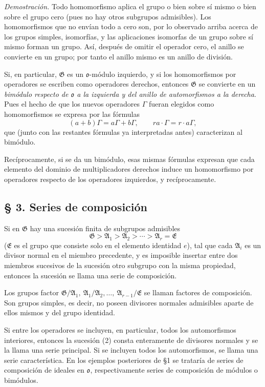 \documentclass[11pt]{article}
\providecommand{\mG}{\mathfrak{G}}
\providecommand{\mA}{\mathfrak{A}}
\providecommand{\mE}{\mathfrak{E}}
\providecommand{\mo}{\mathfrak{o}}
\begin{document}
\emph{Demostración.} Todo homomorfismo aplica el grupo o bien sobre sí mismo o bien sobre el grupo cero (pues no hay otros subgrupos admisibles). Los homomorfismos que no envían todo a cero son, por lo observado arriba acerca de los grupos simples, isomorfías, y las aplicaciones isomorfas de un grupo sobre sí mismo forman un grupo. Así, después de omitir el operador cero, el anillo se convierte en un grupo; por tanto el anillo mismo es un anillo de división.

Si, en particular, $\mG$ es un $\mo$-módulo izquierdo, y si los homomorfismos por operadores se escriben como operadores derechos, entonces $\mG$ se convierte en un \emph{bimódulo respecto de $\mo$ a la izquierda y del anillo de automorfismos a la derecha}. Pues el hecho de que los nuevos operadores $\Gamma$ fueran elegidos como homomorfismos se expresa por las fórmulas
\[
        (a+b)\Gamma=a\Gamma+b\Gamma,
        \qquad ra\cdot\Gamma=r\cdot a\Gamma,
\]
que (junto con las restantes fórmulas ya interpretadas antes) caracterizan al bimódulo.

Recíprocamente, si se da un bimódulo, esas mismas fórmulas expresan que cada elemento del dominio de multiplicadores derechos induce un homomorfismo por operadores respecto de los operadores izquierdos, y recíprocamente.

\subsection*{§ 3. Series de composición}

Si en $\mG$ hay una sucesión finita de subgrupos admisibles
\[
        \mG>\mA_1>\mA_2>\cdots>\mA_r=\mE \tag{2}
\]
($\mE$ es el grupo que consiste solo en el elemento identidad $e$), tal que cada $\mA_i$ es un divisor normal en el miembro precedente, y es imposible insertar entre dos miembros sucesivos de la sucesión otro subgrupo con la misma propiedad, entonces la sucesión se llama una serie de composición.

Los grupos factor $\mG/\mA_1,\ \mA_1/\mA_2,\ldots,\ \mA_{r-1}/\mE$ se llaman factores de composición. Son grupos simples, es decir, no poseen divisores normales admisibles aparte de ellos mismos y del grupo identidad.

Si entre los operadores se incluyen, en particular, todos los automorfismos interiores, entonces la sucesión (2) consta enteramente de divisores normales y se la llama una serie principal. Si se incluyen todos los automorfismos, se llama una serie característica. En los ejemplos posteriores de §1 se trataría de series de composición de ideales en $\mo$, respectivamente series de composición de módulos o bimódulos.
\end{document}
